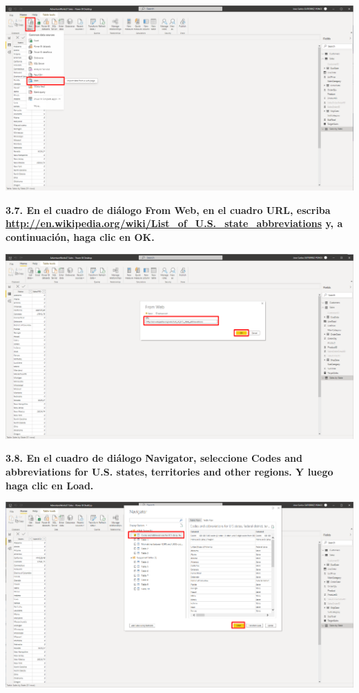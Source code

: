 \documentclass{article}
\begin{document}
    \begin{center}
		\includegraphics[width=14cm]{./images/53} 
	\end{center}

\textbf{3.7. En el cuadro de diálogo \textbf{From Web}, en el cuadro \textbf{URL}, escriba \url{http://en.wikipedia.org/wiki/List_of_U.S._state_abbreviations} y, a continuación, haga clic en \textbf{OK}.}

    \begin{center}
		\includegraphics[width=14cm]{./images/54} 
	\end{center}
\newpage
\textbf{3.8. En el cuadro de diálogo \textbf{Navigator}, seleccione \textbf{Codes and abbreviations for U.S. states, territories and other regions}. Y luego haga clic en \textbf{Load}.}

    \begin{center}
		\includegraphics[width=14cm]{./images/55} 
	\end{center}
\end{document}
